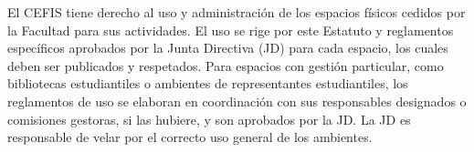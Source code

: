 \documentclass[11pt]{article}
\begin{document}
\begin{artitems}
\end{artitems}

El CEFIS tiene derecho al uso y administración de los espacios físicos cedidos por la Facultad para sus actividades. El uso se rige por este Estatuto y reglamentos específicos aprobados por la Junta Directiva (JD) para cada espacio, los cuales deben ser publicados y respetados. Para espacios con gestión particular, como bibliotecas estudiantiles o ambientes de representantes estudiantiles, los reglamentos de uso se elaboran en coordinación con sus responsables designados o comisiones gestoras, si las hubiere, y son aprobados por la JD.\@{} La JD es responsable de velar por el correcto uso general de los ambientes.
\end{document}
